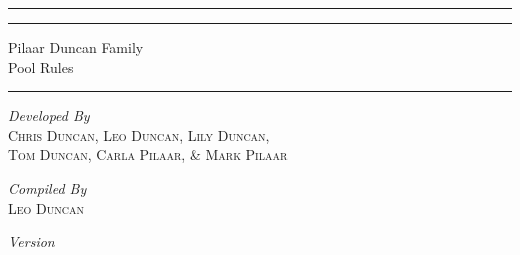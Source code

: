 \begin{titlepage}
	

	\centering %
	
	\textcolor{white}{\rule{\textwidth}{1pt}} %
	\vspace{2pt}\vspace{-\baselineskip} %
	\textcolor{white}{\rule{\textwidth}{0.4pt}} %
	\vspace{0.1\textheight} %
	
	
	\textcolor{titlegreen}{\LARGE Pilaar Duncan Family}\\[0.5\baselineskip] %
	\textcolor{titlegreen}{\Huge Pool Rules}\\[0.5\baselineskip] %
	
	\vspace{0.025\textheight} %
	\rule{0.3\textwidth}{0.4pt} %
	\vspace{0.1\textheight} %
	
	{\large \textit{Developed By}}\\[0.75\baselineskip] %
    {\Large \textsc{Chris Duncan, Leo Duncan, Lily Duncan,}}\\[0.5\baselineskip]
    {\Large \textsc{Tom Duncan, Carla Pilaar, \& Mark Pilaar}}\\[0.5\baselineskip]

    \vspace{3\baselineskip}

    {\large \textit{Compiled By}}\\[0.75\baselineskip] %
    {\Large \textsc{Leo Duncan}}\\[0.5\baselineskip]

    \vfill

    {\normalsize \textit{Version \currentversion}}
	
\end{titlepage}

